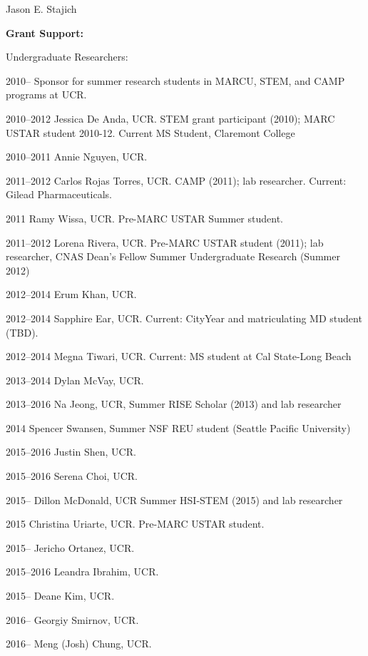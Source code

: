\documentclass[10pt]{article}
\begin{document}
\begin{cv}{\centerline{Jason E. Stajich}}
\begin{cvlistcompact}{\bf Grant Support:}
\begin{cvlistcompact}{Undergraduate Researchers:}
\item[2010--] Sponsor for summer research students in MARCU, STEM, and CAMP
  programs at UCR.
\item [2010--2012] Jessica De Anda, UCR. STEM grant participant
  (2010); MARC USTAR student 2010-12. Current MS Student, Claremont College
\item [2010--2011] Annie Nguyen, UCR.
\item [2011--2012] Carlos Rojas Torres, UCR. CAMP (2011); lab
  researcher. Current: Gilead Pharmaceuticals.
\item [2011] Ramy Wissa, UCR. Pre-MARC USTAR Summer student.
\item [2011--2012] Lorena Rivera, UCR. Pre-MARC USTAR student (2011); lab
  researcher, CNAS Dean's Fellow Summer Undergraduate Research (Summer 2012)
\item [2012--2014] Erum Khan, UCR.
\item [2012--2014] Sapphire Ear, UCR. Current: CityYear and
  matriculating MD student (TBD).
\item [2012--2014] Megna Tiwari, UCR. Current: MS student at Cal
  State-Long Beach
\item [2013--2014] Dylan McVay, UCR.
\item [2013--2016] Na Jeong, UCR, Summer RISE Scholar (2013) and lab researcher
\item [2014] Spencer Swansen, Summer NSF REU student (Seattle Pacific University)
\item [2015--2016] Justin Shen, UCR.
\item [2015--2016] Serena Choi, UCR.
\item [2015--] Dillon McDonald, UCR Summer HSI-STEM (2015) and lab researcher
\item [2015] Christina Uriarte, UCR. Pre-MARC USTAR student.
\item [2015--] Jericho Ortanez, UCR.
\item [2015--2016] Leandra Ibrahim, UCR.
\item [2015--] Deane Kim, UCR.
\item [2016--] Georgiy Smirnov, UCR.
\item [2016--] Meng (Josh) Chung, UCR.
\end{cvlistcompact}


\end{cvlistcompact}
\end{cv}
\end{document}
